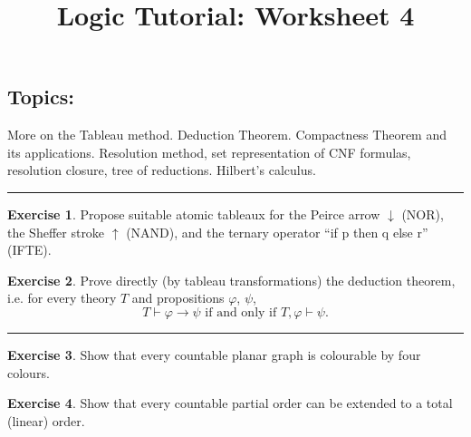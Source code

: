 \documentclass{amsart}
\title{\sc Logic Tutorial: Worksheet 4}
\date{}
\theoremstyle{definition}
\newtheorem{problem}{Exercise}
\begin{document}
\maketitle


\subsection*{Topics:} More on the Tableau method. Deduction Theorem. Compactness Theorem and its applications. Resolution method, set representation of CNF formulas, resolution closure, tree of reductions. Hilbert's calculus.

\medskip \hrule

\begin{problem} Propose suitable atomic tableaux for the Peirce arrow $\downarrow$ (NOR), the Sheffer stroke $\uparrow$ (NAND), and the ternary operator ``if p then q else r'' (IFTE).
\end{problem}\medskip

\begin{problem}
Prove directly (by tableau transformations) the deduction theorem, i.e. for every theory $T$ and propositions $\varphi$, $\psi$,
$$T \vdash \varphi\to \psi\text{\ \ if and only if\ \ }T,\varphi \vdash \psi.$$
\end{problem}\medskip


\hrule

\begin{problem}
Show that every countable planar graph is colourable by four colours.
\end{problem}\medskip

\begin{problem}
Show that every countable partial order can be extended to a total (linear) order.
\end{problem}\medskip

\end{document}
